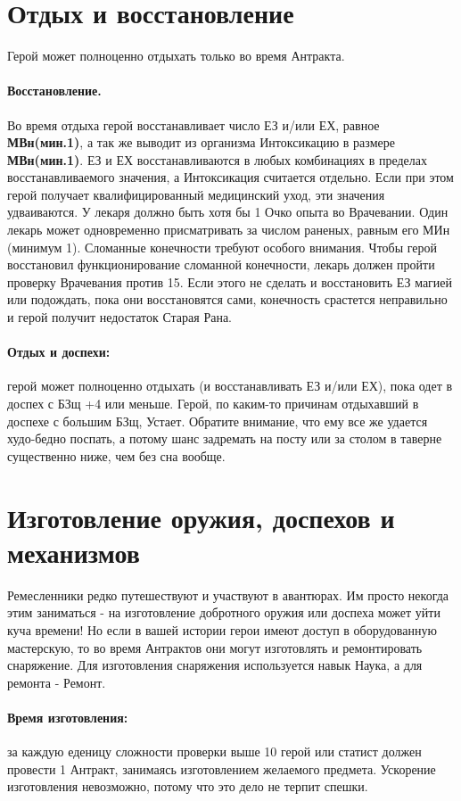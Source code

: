 \section{Отдых и восстановление}
Герой может полноценно отдыхать только во время Антракта.
\paragraph{Восстановление.} Во время отдыха герой восстанавливает число ЕЗ и/или ЕХ, равное \textbf{МВн(мин.1)}, а так же выводит из организма Интоксикацию в размере \textbf{МВн(мин.1)}. ЕЗ и ЕХ восстанавливаются в любых комбинациях в пределах восстанавливаемого значения, а Интоксикация считается отдельно.
\newline Если при этом герой получает квалифицированный медицинский уход, эти значения удваиваются. У лекаря должно быть хотя бы 1 Очко опыта во Врачевании. Один лекарь может одновременно присматривать за числом раненых, равным его МИн (минимум 1).
\newline Сломанные конечности требуют особого внимания. Чтобы герой восстановил функционирование сломанной конечности, лекарь должен пройти проверку Врачевания против 15. Если этого не сделать и восстановить ЕЗ магией или подождать, пока они восстановятся сами, конечность срастется неправильно и герой получит недостаток Старая Рана.
\paragraph{Отдых и доспехи:} герой может полноценно отдыхать (и восстанавливать ЕЗ и/или ЕХ), пока одет в доспех с БЗщ +4 или меньше. Герой, по каким-то причинам отдыхавший в доспехе с большим БЗщ, Устает. Обратите внимание, что ему все же удается худо-бедно поспать, а потому шанс задремать на посту или за столом в таверне существенно ниже, чем без сна вообще.
\section{Изготовление оружия, доспехов и механизмов}
Ремесленники редко путешествуют и участвуют в авантюрах. Им просто некогда этим заниматься - на изготовление добротного оружия или доспеха может уйти куча времени! Но если в вашей истории герои имеют доступ в оборудованную мастерскую, то во время Антрактов они могут изготовлять и ремонтировать снаряжение. Для изготовления снаряжения используется навык Наука, а для ремонта - Ремонт.
\paragraph{Время изготовления:} за каждую еденицу сложности проверки выше 10 герой или статист должен провести 1 Антракт, занимаясь изготовлением желаемого предмета. Ускорение изготовления невозможно, потому что это дело не терпит спешки.

